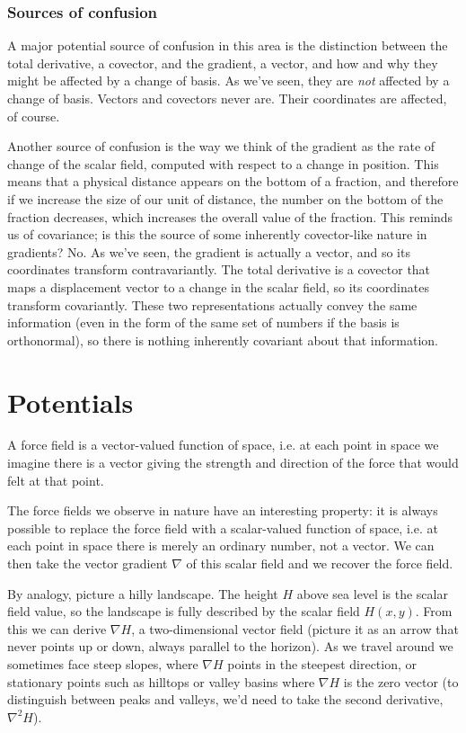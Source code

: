 \subsection{Sources of confusion}

A major potential source of confusion in this area is the distinction between the total derivative, a covector, and the gradient, a vector, and how and why they might be affected by a change of basis. As we've seen, they are \textit{not} affected by a change of basis. Vectors and covectors never are. Their coordinates are affected, of course.

Another source of confusion is the way we think of the gradient as the rate of change of the scalar field, computed with respect to a change in position. This means that a physical distance appears on the bottom of a fraction, and therefore if we increase the size of our unit of distance, the number on the bottom of the fraction decreases, which increases the overall value of the fraction. This reminds us of covariance; is this the source of some inherently covector-like nature in gradients? No. As we've seen, the gradient is actually a vector, and so its coordinates transform contravariantly. The total derivative is a covector that maps a displacement vector to a change in the scalar field, so its coordinates transform covariantly. These two representations actually convey the same information (even in the form of the same set of numbers if the basis is orthonormal), so there is nothing inherently covariant about that information.

\chapter{Potentials} \label{ch:potential}

A force field is a vector-valued function of space, i.e. at each point in space we imagine there is a vector giving the strength and direction of the force that would felt at that point.

The force fields we observe in nature have an interesting property: it is always possible to replace the force field with a scalar-valued function of space, i.e. at each point in space there is merely an ordinary number, not a vector. We can then take the vector gradient $\nabla$ of this scalar field and we recover the force field.

By analogy, picture a hilly landscape. The height $H$ above sea level is the scalar field value, so the landscape is fully described by the scalar field $H(x, y)$. From this we can derive $\nabla H$, a two-dimensional vector field (picture it as an arrow that never points up or down, always parallel to the horizon). As we travel around we sometimes face steep slopes, where $\nabla H$ points in the steepest direction, or stationary points such as hilltops or valley basins where $\nabla H$ is the zero vector (to distinguish between peaks and valleys, we'd need to take the second derivative, $\nabla^2H$).

